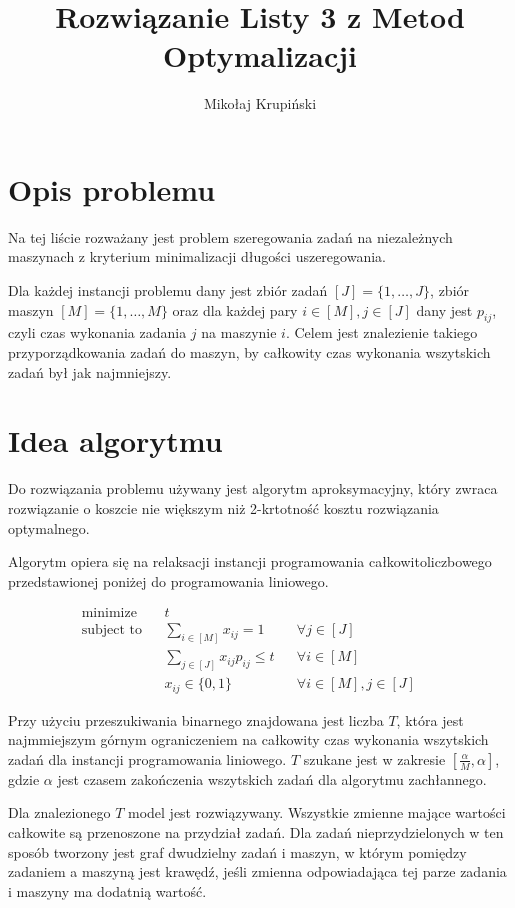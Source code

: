\documentclass[12pt]{article}
\title{Rozwiązanie Listy 3 z Metod Optymalizacji}
\author{Mikołaj Krupiński}
\begin{document}
\maketitle

\section{Opis problemu}

Na tej liście rozważany jest problem szeregowania zadań na niezależnych maszynach z kryterium minimalizacji długości uszeregowania.

Dla każdej instancji problemu dany jest zbiór zadań $[J]=\{1,\dots,J\}$, zbiór maszyn $[M]=\{1,\dots,M\}$ oraz dla każdej pary $i \in [M], j \in [J]$ dany jest $p_{ij}$, czyli czas wykonania zadania $j$ na maszynie $i$. Celem jest znalezienie takiego przyporządkowania zadań do maszyn, by całkowity czas wykonania wszytskich zadań był jak najmniejszy.

\section{Idea algorytmu}

Do rozwiązania problemu używany jest algorytm aproksymacyjny, który zwraca rozwiązanie o koszcie nie większym niż 2-krtotność kosztu rozwiązania optymalnego.

Algorytm opiera się na relaksacji instancji programowania całkowitoliczbowego przedstawionej poniżej do programowania liniowego.

\begin{align*}
    \text{minimize} && t && && \\
    \text{subject to} && \sum_{i \in [M]} x_{ij} = 1 && \forall j \in [J] && \\
    && \sum_{j \in [J]} x_{ij}p_{ij} \leq t && \forall i \in [M] && \\
    && x_{ij} \in \{0,1\} && \forall i \in [M], j \in [J] &&
\end{align*}

Przy użyciu przeszukiwania binarnego znajdowana jest liczba $T$, która jest najmmiejszym górnym ograniczeniem na całkowity czas wykonania wszytskich zadań dla instancji programowania liniowego. $T$ szukane jest w zakresie $[\frac{\alpha}{M}, \alpha]$, gdzie $\alpha$ jest czasem zakończenia wszytskich zadań dla algorytmu zachłannego.

Dla znalezionego $T$ model jest rozwiązywany. Wszystkie zmienne mające wartości całkowite są przenoszone na przydział zadań. Dla zadań nieprzydzielonych w ten sposób tworzony jest graf dwudzielny zadań i maszyn, w którym pomiędzy zadaniem a maszyną jest krawędź, jeśli zmienna odpowiadająca tej parze zadania i maszyny ma dodatnią wartość.
\end{document}
